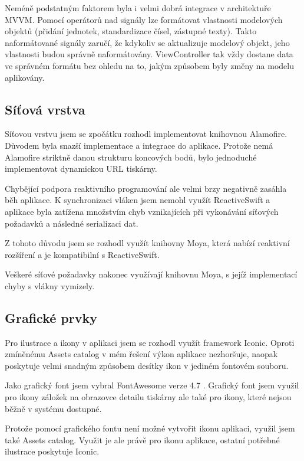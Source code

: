 Neméně podstatným faktorem byla i velmi dobrá integrace v architektuře MVVM.
Pomocí operátorů nad signály lze formátovat vlastnosti modelových objektů (přidání jednotek, standardizace čísel, zástupné texty).
Takto naformátované signály zaručí, že kdykoliv se aktualizuje modelový objekt, jeho vlastnosti budou správně naformátovány.
ViewController tak vždy dostane data ve správném formátu bez ohledu na to, jakým způsobem byly změny na modelu aplikovány.

\subsection{Síťová vrstva}

Síťovou vrstvu jsem se zpočátku rozhodl implementovat knihovnou Alamofire.
Důvodem byla snazší implementace a integrace do aplikace.
Protože nemá Alamofire striktně danou strukturu koncových bodů, bylo jednoduché implementovat dynamickou URL tiskárny.

Chybějící podpora reaktivního programování ale velmi brzy negativně zasáhla běh aplikace.
K synchronizaci vláken jsem nemohl využít ReactiveSwift a aplikace byla zatížena množstvím chyb vznikajících při vykonávání síťových požadavků a následné serializaci dat.

Z tohoto důvodu jsem se rozhodl využít knihovny Moya, která nabízí reaktivní rozšíření a je kompatibilní s ReactiveSwift.

Veškeré síťové požadavky nakonec využívají knihovnu Moya, s jejíž implementací chyby s vlákny vymizely.

\subsection{Grafické prvky}

Pro ilustrace a ikony v aplikaci jsem se rozhodl využít framework Iconic.
Oproti zmíněnému Assets catalog v mém řešení výkon aplikace nezhoršuje, naopak poskytuje velmi snadným způsobem desítky ikon v jediném fontovém souboru.

Jako grafický font jsem vybral FontAwesome verze 4.7 \cite{fontawesome-web}.
Grafický font jsem využil pro ikony záložek na obrazovce detailu tiskárny ale také pro ikony, které nejsou běžně v systému dostupné.

Protože pomocí grafického fontu není možné vytvořit ikonu aplikaci, využil jsem také Assets catalog.
Využit je ale právě pro ikonu aplikace, ostatní potřebné ilustrace poskytuje Iconic.

